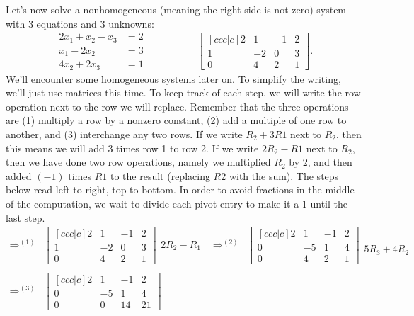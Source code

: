 {\begin{example}
Let's now solve a nonhomogeneous (meaning the right side is not zero) system with 3 equations and 3 unknowns: $$\begin{array}{rl}
2x_1+x_2-x_3&=2\\
x_1-2x_2 &=3\\
4x_2+2x_3&=1
\end{array} \quad\quad\quad\quad\quad
\begin{bmatrix}[ccc|c] 2&1&-1&2\\1&-2&0&3\\0&4&2&1\end{bmatrix}.$$
We'll encounter some homogeneous systems later on.  To simplify the
writing, we'll just use matrices this time.  To keep track of each
step, we will write the row operation next to the row we will replace.
Remember that the three operations are (1) multiply a row by a nonzero
constant, (2) add a multiple of one row to another, and (3)
interchange any two rows.  If we write $R_2+3R1$ next to $R_2$, then
this means we will add 3 times row 1 to row 2.  If we write $2R_2-R1$
next to $R_2$, then we have done two row operations, namely we
multiplied $R_2$ by $2$, and then added $(-1)$ times $R1$ to the result
(replacing $R2$ with the sum).  The steps below read left to right,
top to bottom.  In order to avoid fractions in the middle of the
computation, we wait to divide each pivot entry to make it a 1 until
the last step.
$$\begin{array}{rlcl}
\Rightarrow^{(1)}&
 \begin{bmatrix}[ccc|c] 2&1&-1&2\\1&-2&0&3\\0&4&2&1\end{bmatrix}
  \begin{array}{lr} \ \\2R_2-R_1\\ \ \end{array}
&\Rightarrow^{(2)}& 
\begin{bmatrix}[ccc|c] 2&1&-1&2\\0&-5&1&4\\0&4&2&1\end{bmatrix} 
\begin{array}{lr}\ \\ \ \\5R_3+4R_2 \end{array}
\\ \\ \Rightarrow^{(3)}&
 \begin{bmatrix}[ccc|c] 2&1&-1&2\\0&-5&1&4\\0&0&14&21\end{bmatrix} 

\end{array}$$
\end{example}}
